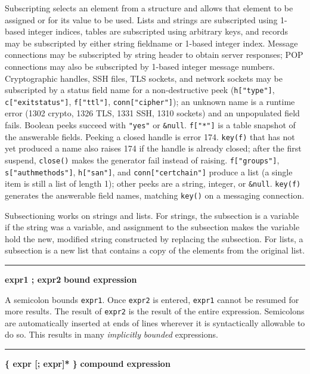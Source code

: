 Subscripting selects an element from a structure and allows that element
to be assigned or for its value to be used. Lists and strings are
subscripted using 1-based integer indices, tables are subscripted using
arbitrary keys, and records may be subscripted by either string
fieldname or 1-based integer index. Message connections may be
subscripted by string header to obtain server responses; POP
connections may also be subscripted by 1-based integer message numbers.
Cryptographic handles, SSH files, TLS sockets, and network sockets may
be subscripted by a status field name for a non-destructive peek
(\texttt{h["type"]}, \texttt{c["exitstatus"]}, \texttt{f["ttl"]},
\texttt{conn["cipher"]}); an unknown name is a runtime error
(1302 crypto, 1326 TLS, 1331 SSH, 1310 sockets) and an
unpopulated field fails. Boolean peeks succeed with \texttt{"yes"} or
\texttt{\&null}. \texttt{f["*"]} is a table snapshot of the answerable
fields. Peeking a closed handle is error 174.
\texttt{key(f)} that has not yet produced a name also raises 174 if the
handle is already closed; after the first suspend, \texttt{close()}
makes the generator fail instead of raising.
\texttt{f["groups"]}, \texttt{s["authmethods"]}, \texttt{h["san"]}, and
\texttt{conn["certchain"]} produce a list (a single item is still a
list of length 1); other peeks are a string, integer, or \texttt{\&null}.
\texttt{key(f)} generates the answerable field names, matching
\texttt{key()} on a messaging connection.

Subsectioning works on strings and lists. For strings, the subsection is
a variable if the string was a variable, and
assignment to the subsection makes the
variable hold the new, modified string constructed by replacing the subsection.
For lists, a subsection is a new
list that contains a copy of the elements from the original list.

\bigskip\hrule\vspace{0.1cm}
\noindent
{\bf expr1 ; expr2 } \hfill {\bf bound expression}

\noindent
A semicolon bounds \texttt{expr1}. Once \texttt{expr2} is entered,
\texttt{expr1} cannot be resumed for more results. The result of
\texttt{expr2} is the result of the entire expression.
Semicolons are automatically
inserted at ends of lines wherever it is syntactically
allowable to do so. This results in many \textit{implicitly} 
\textit{bounded} expressions.

\bigskip\hrule\vspace{0.1cm}
\noindent
{\bf \{ expr [; expr]* \} } \hfill {\bf compound expression}

